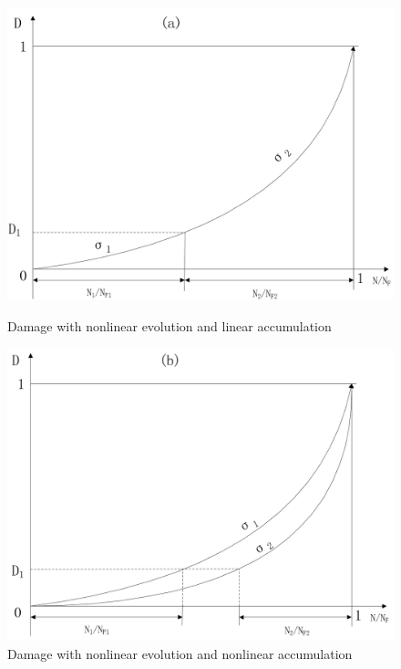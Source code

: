 \documentclass[3p,times,procedia,number]{elsarticle}
\begin{document}
\begin{figure}[h!]
	\begin{minipage}[t]{0.5\textwidth}
		\includegraphics[width=\textwidth]{figures//linearaccumulation.png} 
		\caption{Damage with nonlinear evolution and linear accumulation}
		\label{linear accumulation}
	\end{minipage}
	\begin{minipage}[t]{0.5\textwidth}
		\includegraphics[width=\textwidth]{figures//nonlinearaccumulation.png} 
		\caption{Damage with nonlinear evolution and nonlinear accumulation}
		\label{nonlinear accumulation}
	\end{minipage}
\end{figure} 
\clearpage
\end{document}
